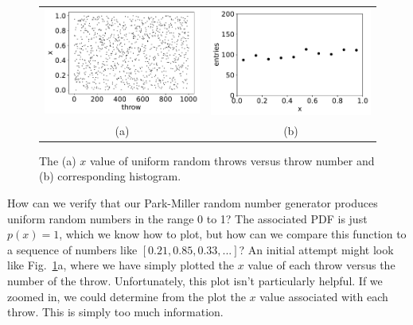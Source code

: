 \begin{figure}[htbp]
 \begin{center}
 \begin{tabular}{cc}   
  \includegraphics[height=0.22\textheight]{figs/monte_carlo/flat2d.pdf} &
  \includegraphics[height=0.22\textheight]{figs/monte_carlo/flathist.pdf} \\
  (a) & (b) \\
 \end{tabular}
\caption{The (a) $x$ value of uniform random throws versus throw number and (b) corresponding histogram. }
\label{fig:flathist}
\end{center}
\end{figure}

\noindent
How can we verify that our Park-Miller random number generator
produces uniform random numbers in the range 0 to 1?  The associated
PDF is just $p(x)=1$, which we know how to plot, but how can we
compare this function to a sequence of numbers like $[0.21, 0.85,
  0.33, ...]$?  An initial attempt might look like
Fig.~\ref{fig:flathist}a, where we have simply plotted the $x$ value
of each throw versus the number of the throw.  Unfortunately, this
plot isn't particularly helpful.  If we zoomed in, we could determine
from the plot the $x$ value associated with each throw.  This is
simply too much information.

